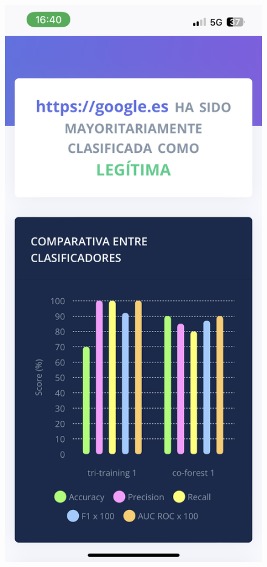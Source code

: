 \begin{figure}[h]
	\includegraphics[scale=0.1]{../img/anexos/user_guide/0_dashboard_mobile}
	\label{e-0:dashboard-mobile}
\end{figure}

